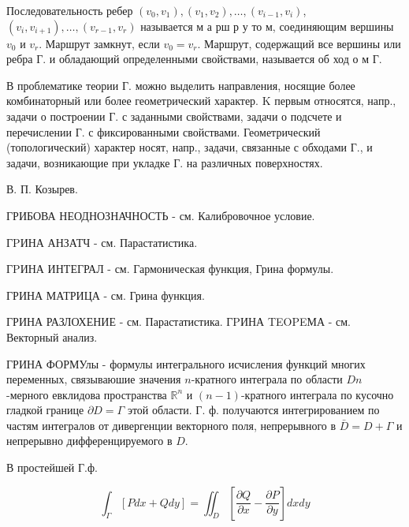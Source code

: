 \documentclass[10pt]{article}
\begin{document}
Последовательность ребер $\left(v_{0}, v_{1}\right),\left(v_{1}, v_{2}\right), \ldots,\left(v_{i-1}, v_{i}\right)$, $\left(v_{i}, v_{i+1}\right), \ldots,\left(v_{r-1}, v_{r}\right)$ называется м а рш р у то м, соединяющим вершины $v_{0}$ и $v_{r}$. Маршрут замкнут, если $v_{0}=v_{r}$. Маршрут, содержащий все вершины или ребра Г. и обладающий определенными свойствами, называется об ход о м Г.



В проблематике теории Г. можно выделить направления, носящие более комбинаторный или более геометрический характер. K первым относятся, напр., задачи о построении Г. с заданными свойствами, задачи о подсчете и перечислении Г. с фиксированными свойствами. Геометрический (топологический) характер носят, напр., задачи, связанные с обходами Г., и задачи, возникающие при укладке Г. на различных поверхностях.



В. П. Козырев.



ГРИБОВА НЕОДНОЗНАЧНОСТЬ - см. Калибровочное условие.



ГPИНА АНЗАТЧ - см. Парастатистика.



ГPИНА ИНТЕГРАЛ - см. Гармоническая функция, Грина формулы.



ГРИНА МАТРИЦА - см. Грина функция.



ГРИНА РАЗЛОХЕНИЕ - см. Парастатистика. ГPИНА TEOPEМА - см. Векторный анализ.



ГРИНА ФОРМУлы - формулы интегрального исчисления функций многих переменных, связываюшие значения $n$-кратного интеграла по области $D n$-мерного евклидова пространства $\mathbb{R}^{n}$ и $(n-1)$-кратного интеграла по кусочно гладкой границе $\partial D=\Gamma$ этой области. Г. ф. получаются интегрированием по частям интегралов от дивергенции векторного поля, непрерывного в $\bar{D}=D+\Gamma$ и непрерывно дифференцируемого в $D$.



В простейшей Г.ф.



\[

\int_{\Gamma}[P d x+Q d y]=\iint_{D}\left[\frac{\partial Q}{\partial x}-\frac{\partial P}{\partial y}\right] d x d y

\]
\end{document}
